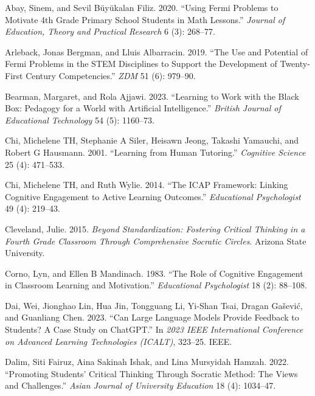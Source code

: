 \documentclass[
  11pt,
]{article}
\newlength{\cslhangindent}
\newenvironment{CSLReferences}[2] %
 {\begin{list}{}{%
  \setlength{\itemindent}{0pt}
  \setlength{\leftmargin}{0pt}
  \setlength{\parsep}{0pt}
  \ifodd #1
   \setlength{\leftmargin}{\cslhangindent}
   \setlength{\itemindent}{-1\cslhangindent}
  \fi
  \setlength{\itemsep}{#2\baselineskip}}}
 {\end{list}}
\begin{document}
\label{refs}
\begin{CSLReferences}{1}{0}
Abay, Sinem, and Sevil Büyükalan Filiz. 2020. {``Using Fermi Problems to Motivate 4th Grade Primary School Students in Math Lessons.''} \emph{Journal of Education, Theory and Practical Research} 6 (3): 268--77.

Arleback, Jonas Bergman, and Lluis Albarracin. 2019. {``The Use and Potential of Fermi Problems in the STEM Disciplines to Support the Development of Twenty-First Century Competencies.''} \emph{ZDM} 51 (6): 979--90.

Bearman, Margaret, and Rola Ajjawi. 2023. {``Learning to Work with the Black Box: Pedagogy for a World with Artificial Intelligence.''} \emph{British Journal of Educational Technology} 54 (5): 1160--73.

Chi, Michelene TH, Stephanie A Siler, Heisawn Jeong, Takashi Yamauchi, and Robert G Hausmann. 2001. {``Learning from Human Tutoring.''} \emph{Cognitive Science} 25 (4): 471--533.

Chi, Michelene TH, and Ruth Wylie. 2014. {``The ICAP Framework: Linking Cognitive Engagement to Active Learning Outcomes.''} \emph{Educational Psychologist} 49 (4): 219--43.

Cleveland, Julie. 2015. \emph{Beyond Standardization: Fostering Critical Thinking in a Fourth Grade Classroom Through Comprehensive Socratic Circles}. Arizona State University.

Corno, Lyn, and Ellen B Mandinach. 1983. {``The Role of Cognitive Engagement in Classroom Learning and Motivation.''} \emph{Educational Psychologist} 18 (2): 88--108.

Dai, Wei, Jionghao Lin, Hua Jin, Tongguang Li, Yi-Shan Tsai, Dragan Gašević, and Guanliang Chen. 2023. {``Can Large Language Models Provide Feedback to Students? A Case Study on ChatGPT.''} In \emph{2023 IEEE International Conference on Advanced Learning Technologies (ICALT)}, 323--25. IEEE.

Dalim, Siti Fairuz, Aina Sakinah Ishak, and Lina Mursyidah Hamzah. 2022. {``Promoting Students' Critical Thinking Through Socratic Method: The Views and Challenges.''} \emph{Asian Journal of University Education} 18 (4): 1034--47.


\end{CSLReferences}
\end{document}
